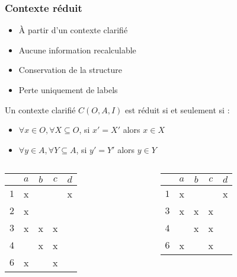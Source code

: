 \documentclass{beamer}
\begin{document}
\begin{frame}
	\frametitle{Contexte réduit}
	 {
		\begin{itemize}
			\item À partir d'un contexte clarifié
			\item Aucune information recalculable
			\item Conservation de la structure
			\item Perte uniquement de labels
		\end{itemize}
		\begin{definition}
			Un contexte clarifié $C(O, A, I)$ est réduit si et seulement si :
			\begin{itemize}
				\item $\forall x \in O, \forall X \subseteq O$, si $x' = X'$ alors $x \in X$
				\item $\forall y \in A, \forall Y \subseteq A$, si $y' = Y'$ alors $y \in Y$
			\end{itemize}
		\end{definition}
	} {
		\begin{columns}[T] %
			\begin{column}{.48\textwidth}
				\begin{center}
				\begin{tabular}{ l | c c c c }
					 & $a$ & $b$ & $c$ & $d$ \\
					\hline
					$1$ & x & & & x \\
					$2$ & x & & & \\
					$3$ & x & x & x & \\
					$4$ & & x & x & \\
					$6$ & x & & x & \\
				\end{tabular}
				\end{center}
			\end{column}%
			\hfill%
			\begin{column}{.48\textwidth}
				\begin{center}
				\begin{tabular}{ l | c c c c }
					 & $a$ & $b$ & $c$ & $d$ \\
					\hline
					$1$ & x & & & x \\
					$3$ & x & x & x & \\
					$4$ & & x & x & \\
					$6$ & x & & x & \\
				\end{tabular}
				\end{center}
			\end{column}%
		\end{columns}
	}
\end{frame}
\end{document}
